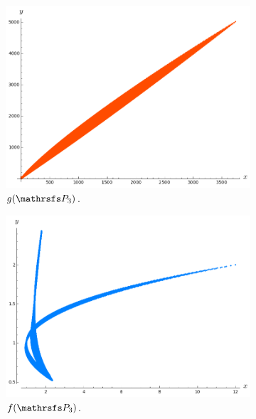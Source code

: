 \documentclass{beamer}
\begin{document}
\begin{frame}
\begin{figure}
\vspace{-0.25cm}
\begin{subfigure}{.32\linewidth}\centering
\includegraphics[width=1\textwidth]{plots/ch5_04_P3.png}
\caption{$g(\PP_3)$.}
\end{subfigure}
\begin{subfigure}{.32\linewidth}\centering
\includegraphics[width=1\textwidth]{plots/ch5_05_P3.png}
\caption{$f(\PP_3)$.}
\end{subfigure}
\begin{subfigure}{.32\linewidth}\centering

\end{subfigure}
\end{figure}
\end{frame}
\end{document}
